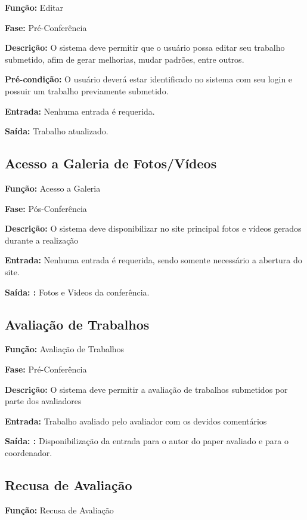 \documentclass[letter]{article}
\begin{document}
\textbf{Função:}  Editar

\textbf{Fase:} Pré-Conferência

\textbf{Descrição:} O sistema deve permitir que o usuário possa editar seu trabalho submetido, afim de gerar melhorias, mudar padrões, entre outros.

\textbf{Pré-condição:}  O usuário deverá estar identificado no sistema com seu login e possuir um trabalho previamente submetido.

\textbf{Entrada:}  Nenhuma entrada é requerida.

\textbf{Saída:}  Trabalho atualizado.



\subsection{Acesso a Galeria de Fotos/Vídeos}

\textbf{Função:} Acesso a Galeria

\textbf{Fase: } Pós-Conferência

\textbf{Descrição: } O sistema deve disponibilizar no site principal fotos e vídeos gerados durante a realização

\textbf{Entrada: } Nenhuma entrada é requerida, sendo somente necessário a abertura do site.

\textbf{Saída: :} Fotos e Videos da conferência.



\subsection{ Avaliação de Trabalhos}

\textbf{Função:} Avaliação de Trabalhos

\textbf{Fase: } Pré-Conferência

\textbf{Descrição: } O sistema deve permitir a avaliação de trabalhos submetidos por parte dos avaliadores

\textbf{Entrada: } Trabalho avaliado pelo avaliador com os devidos comentários

\textbf{Saída: :} Disponibilização da entrada para o autor do paper avaliado e para o coordenador.


\subsection{ Recusa de Avaliação}

\textbf{Função:} Recusa de Avaliação
\end{document}
